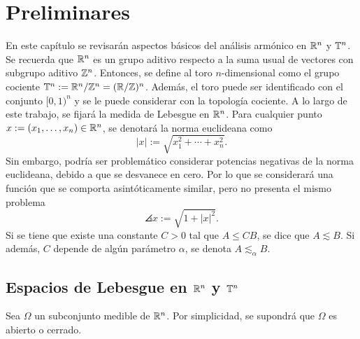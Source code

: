 \chapter{Preliminares}

En este capítulo se revisarán aspectos básicos del análisis armónico en 
$\mathbb{R}^n$ y $\mathbb{T}^n$. 
Se recuerda que $\mathbb{R}^n$ es un grupo aditivo respecto a la suma usual de vectores
con subgrupo aditivo $\mathbb{Z}^n$. Entonces, se define al toro $n$-dimensional
como el grupo cociente $\mathbb{T}^n := \mathbb{R}^n/\mathbb{Z}^n = (\mathbb{R}/\mathbb{Z})^n$. Además, 
el toro puede ser identificado con el conjunto $[0, 1)^n$ y se le puede considerar
con la topología cociente. A lo largo de este trabajo, se fijará la
medida de Lebesgue en $\mathbb{R}^n$. Para cualquier punto 
$x := (x_1, \ldots, x_n) \in \mathbb{R}^n$, se denotará la norma
euclideana como 
\begin{equation*}
    |x| := \sqrt{x_1^2 + \cdots + x_n^2}.
\end{equation*}
Sin embargo, podría ser problemático considerar potencias negativas
de la norma euclideana, debido a que se desvanece en cero. Por lo que
se considerará una función que se comporta asintóticamente similar, 
pero no presenta el mismo problema
\begin{equation*}
    \angles{x} := \sqrt{1 + |x|^2}.
\end{equation*}
Si se tiene que existe una constante $C>0$ tal que $A\leq CB$, se dice que $A\lesssim B$. Si además, $C$ depende de algún parámetro $\alpha$, se denota $A\lesssim_\alpha B$.
\section{Espacios de Lebesgue en $\mathbb{R}^n$ y $\mathbb{T}^n$ }

Sea $\Omega$ un subconjunto medible de $\mathbb{R}^n$. Por simplicidad, se supondrá
que $\Omega$ es abierto o cerrado.

